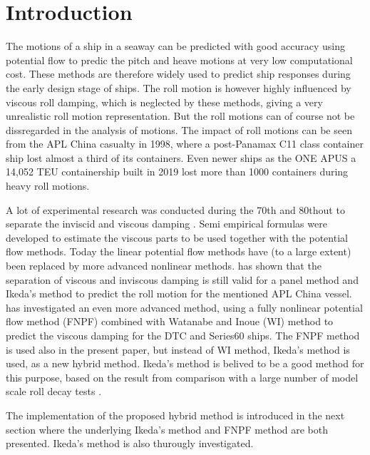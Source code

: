 \section{Introduction}\label{introduction}

The motions of a ship in a seaway can be predicted with good accuracy
using potential flow \cite{7505983/FB64RGPF} to predic the pitch and
heave motions at very low computational cost. These methods are
therefore widely used to predict ship responses during the early design
stage of ships. The roll motion is however highly influenced by viscous
roll damping, which is neglected by these methods, giving a very
unrealistic roll motion representation. But the roll motions can of
course not be dissregarded in the analysis of motions. The impact of
roll motions can be seen from the APL China casualty in 1998, where a
post-Panamax C11 class container ship lost almost a third of its
containers. Even newer ships as the ONE APUS a 14,052 TEU containership
built in 2019 lost more than 1000 containers during heavy roll motions.

A lot of experimental research was conducted during the 70th and 80thout
to separate the inviscid and viscous damping \cite{7505983/937PN5DT}.
Semi empirical formulas were developed to estimate the viscous parts to
be used together with the potential flow methods. Today the linear
potential flow methods have (to a large extent) been replaced by more
advanced nonlinear methods. \cite{7505983/UGK6YEVD} has shown that the
separation of viscous and inviscous damping is still valid for a panel
method and Ikeda's method to predict the roll motion for the mentioned
APL China vessel. \cite{7505983/24TNAV5Z} has investigated an even more
advanced method, using a fully nonlinear potential flow method (FNPF)
combined with Watanabe and Inoue (WI) method to predict the viscous
damping for the DTC \cite{7505983/BYNJ8CFG} and Series60 ships. The FNPF
method is used also in the present paper, but instead of WI method,
Ikeda's method is used, as a new hybrid method. Ikeda's method is
belived to be a good method for this purpose, based on the result from
comparison with a large number of model scale roll decay tests
\cite{7505983/QMGQ76Q9}.

The implementation of the proposed hybrid method is introduced in the
next section where the underlying Ikeda's method and FNPF method are
both presented. Ikeda's method is also thurougly investigated.

    